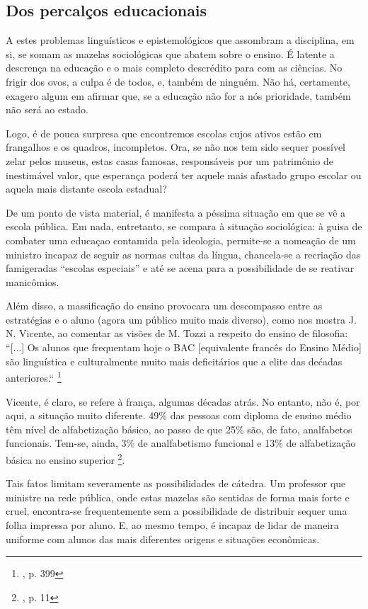 \documentclass[12pt,a4paper]{article}
\begin{document}
	\newpage

	\subsection{Dos percalços educacionais}

	A estes problemas linguísticos e epistemológicos que assombram 
	a disciplina, em si, se somam as mazelas sociológicas que abatem 
	sobre o ensino. É latente a descrença na educação e o mais completo 
	descrédito para com as ciências. No frigir dos ovos, a culpa é de 
	todos, e, também de ninguém. Não há, certamente, exagero algum em 
	afirmar que, se a educação não for a nós prioridade, também não 
	será ao estado. 

	Logo, é de pouca surpresa que encontremos escolas cujos ativos estão 
	em frangalhos e os quadros, incompletos. Ora, se não nos tem sido 
	sequer possível zelar pelos museus, estas casas famosas, responsáveis 
	por um patrimônio de inestimável valor, que esperança poderá ter 
	aquele mais afastado grupo escolar ou aquela mais distante escola 
	estadual? 

	De um ponto de vista material, é manifesta a péssima situação em 
	que se vê a escola pública. Em nada, entretanto, se compara à 
	situação sociológica: à guisa de combater uma educaçao contamida 
	pela ideologia, permite-se a nomeação de um ministro incapaz de 
	seguir as normas cultas da língua, chancela-se a recriação das 
	famigeradas “escolas especiais” e até se acena para a 
	possibilidade de se reativar manicômios. 

	Além disso, a massificação do ensino provocara um descompasso entre 
	as estratégias e o aluno (agora um público muito mais diverso), como 
	nos mostra J. N. Vicente, ao comentar as visões de M. Tozzi a respeito 
	do ensino de filosofia: 
		“[...] Os alunos que frequentam hoje o BAC [equivalente francês 
		do Ensino Médio] são linguística e culturalmente muito mais 
		deficitários que a elite das dećadas anteriores.“
		\footnote{\cite{neves}, p. 399}
	
	Vicente, é claro, se refere à frança, algumas décadas atrás. No 
	entanto, não é, por aqui, a situação muito diferente. 49\% das 
	pessoas com diploma de ensino médio têm nível de alfabetização 
	básico, ao passo de que 25\% são, de fato, analfabetos funcionais. 
	Tem-se, ainda, 3\% de analfabetismo funcional e 13\% de 
	alfabetização básica no ensino superior
	\footnote{\cite{inaf2018}, p. 11}.

	Tais fatos limitam severamente as possibilidades de cátedra. 
	Um professor que ministre na rede pública, onde estas mazelas são 
	sentidas de forma mais forte e cruel, encontra-se frequentemente 
	sem a possibilidade de distribuir sequer uma folha impressa por 
	aluno. E, ao mesmo tempo, é incapaz de lidar de maneira uniforme 
	com alunos das mais diferentes origens e situações econômicas. 
\end{document}
